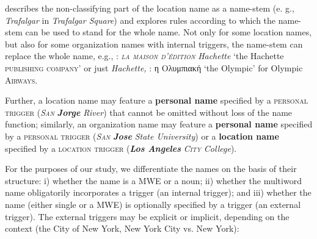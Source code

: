 \documentclass[output=paper]{langsci/langscibook}
\newcommand{\trigger}[1]{\textsc{#1}}
\begin{document}
\cite{carroll1985} describes the non-classifying part of the location name
as a name-stem (e. g., \textit{Trafalgar} in \textit{Trafalgar Square})
and explores rules according to which the name-stem can be used to
stand for the whole name. Not only for some location names, but also
for some organization names with internal triggers, the name-stem can
replace the whole name, e.g., : \textit{\trigger{la maison d’édition}}
\textit{Hachette} ‘the Hachette \trigger{publishing company}’ or just
\textit{Hachette, }: η Ολυμπιακή ‘the Olympic’ for Olympic
\trigger{Airways}.

Further, a  location name may feature a \textbf{personal name} specified
by a \trigger{personal} \trigger{trigger} (\textit{\trigger{San}}
\textbf{\textit{Jorge}} \textit{River}) that cannot be omitted without
loss of the name function; similarly, an organization name may feature
a \textbf{personal name} specified by a \trigger{personal trigger}
(\textit{\trigger{San}} \textbf{\textit{Jose}} \textit{State University})
or a \textbf{location name} specified by a \trigger{location trigger}
(\textbf{\textit{Los Angeles}} \textit{\trigger{City}} \textit{College}).

For the purposes of our study, we differentiate the names on the basis
of their structure: i) whether the name is a MWE or a noun; ii) whether
the multiword name obligatorily incorporates a trigger (an internal
trigger); and iii) whether the name (either single or a MWE) is
optionally specified by a trigger (an external trigger). The external
triggers may be explicit or implicit, depending on the context (the
City of New York, New York City vs. New York):
\end{document}
